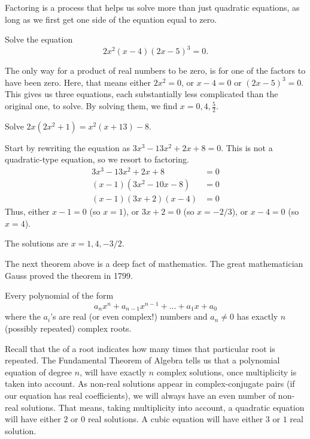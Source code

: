 \documentclass{ximera}
\begin{document}
Factoring is a process that helps us solve more than just quadratic equations, as long as we first get one side of the equation equal to zero.
\begin{example}
	Solve the equation
	\[ 2x^2 \left( x-4 \right) \left( 2x-5\right)^3 = 0. \]
	\begin{explanation}
		The only way for a product of real numbers to be zero, is for one of the factors to have been zero.
		Here, that means either $2x^2 = 0$, or $x-4 = 0$ or $(2x-5)^3 = 0$.
		This gives us three equations, each substantially less complicated than the original one, to solve.  By solving them, we find
		$x = 0, 4, \frac{5}{2}$.
	\end{explanation}
\end{example}

\begin{example}
	Solve  $2x(2x^2 + 1) = x^2(x +13) - 8$.
	\begin{explanation}
		Start by rewriting the equation as $3x^3-13x^2+2x+8 = 0$.  This is not a quadratic-type equation, so we resort to factoring.
		\begin{align*}
			3x^3-13x^2+2x+8 &= 0\\
			(x-1)(3x^2-10x-8) &= 0\\
			(x-1)(3x+2)(x-4) &= 0
		\end{align*}
		Thus, either $x -1 = 0$ (so $x = 1$), or $3x+2=0$ (so $x = -2/3$), or $x-4 = 0$ (so $x=4$).
		
		The solutions are $x = 1, 4, -3/2$.
	\end{explanation}
\end{example}


The next theorem above is a deep fact of mathematics. The great mathematician Gauss proved the theorem in 1799. 
\begin{theorem}
  Every polynomial of the form
  \[
  a_n x^n + a_{n-1} x^{n-1} + \dots + a_1 x + a_0
  \]
  where the $a_i$'s are real (or even complex!) numbers and $a_n \ne 0$ has exactly
  $n$ (possibly repeated) complex roots.
\end{theorem}

Recall that the  of a root indicates how many times that particular root is repeated.
The Fundamental Theorem of Algebra tells us that a polynomial equation of degree $n$, will have exactly $n$ complex solutions, once multiplicity
is taken into account.  As non-real solutions appear in complex-conjugate pairs  (if our equation has real coefficients), we will always have an even number of non-real
solutions.  That means, taking multiplicity into account, a quadratic equation will have either $2$ or $0$ real solutions.  A cubic equation will have either $3$ or $1$ real
solution.
\end{document}
